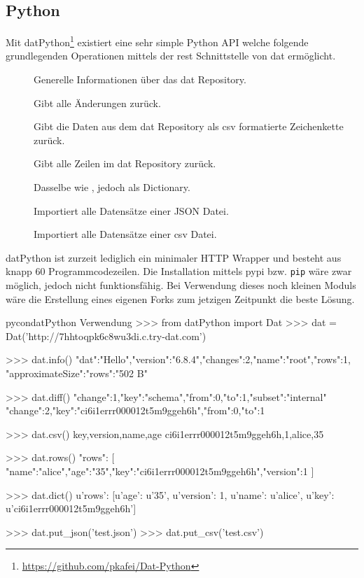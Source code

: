 \subsection{Python}

Mit datPython\footnote{\url{https://github.com/pkafei/Dat-Python}} existiert eine sehr simple Python API welche folgende grundlegenden Operationen mittels der \gls{rest} Schnittstelle von \gls{dat} ermöglicht.

\begin{description}
	\item[] Generelle Informationen über das \gls{dat} Repository.
	\item[] Gibt alle Änderungen zurück.
	\item[] Gibt die Daten aus dem dat Repository als \gls{csv} formatierte Zeichenkette zurück.
	\item[] Gibt alle Zeilen im dat Repository zurück.
	\item[] Dasselbe wie , jedoch als Dictionary.
	\item[] Importiert alle Datensätze einer JSON Datei.
	\item[] Importiert alle Datensätze einer \gls{csv} Datei.
\end{description}

datPython ist zurzeit lediglich ein minimaler HTTP Wrapper und besteht aus knapp 60 Programmcodezeilen. Die Installation mittels \gls{pypi} bzw. \texttt{pip} wäre zwar möglich, jedoch nicht funktionsfähig. Bei Verwendung dieses noch kleinen Moduls wäre die Erstellung eines eigenen Forks zum jetzigen Zeitpunkt die beste Lösung.

\begin{srclst}{pycon}{datPython Verwendung}
>>> from datPython import Dat
>>> dat = Dat('http://7hhtoqpk6c8wu3di.c.try-dat.com')

>>> dat.info()
{"dat":"Hello","version":"6.8.4","changes":2,"name":"root","rows":1, "approximateSize":{"rows":"502 B"}}

>>> dat.diff()
{"change":1,"key":"schema","from":0,"to":1,"subset":"internal"}
{"change":2,"key":"ci6i1errr000012t5m9ggeh6h","from":0,"to":1}

>>> dat.csv()
key,version,name,age
ci6i1errr000012t5m9ggeh6h,1,alice,35

>>> dat.rows()
{"rows": [
	{"name":"alice","age":"35","key":"ci6i1errr000012t5m9ggeh6h","version":1}
	]}

>>> dat.dict()
{u'rows': [{u'age': u'35', u'version': 1, u'name': u'alice', u'key': u'ci6i1errr000012t5m9ggeh6h'}]}

>>> dat.put_json('test.json')
>>> dat.put_csv('test.csv')
\end{srclst}

